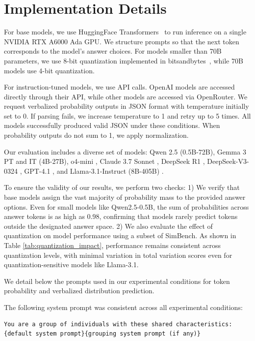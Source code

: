 \documentclass{article} %
\begin{document}
\section{Implementation Details}
\label{sec:implementation_details}

For base models, we use HuggingFace Transformers~\citep{wolf-etal-2020-transformers} to run inference on a single NVIDIA RTX A6000 Ada GPU. We structure prompts so that the next token corresponds to the model's answer choices. For models smaller than 70B parameters, we use 8-bit quantization implemented in bitsandbytes~\citep{10.5555/3600270.3602468}, while 70B models use 4-bit quantization.

For instruction-tuned models, we use API calls. OpenAI models are accessed directly through their API, while other models are accessed via OpenRouter. We request verbalized probability outputs in JSON format with temperature initially set to 0. If parsing fails, we increase temperature to 1 and retry up to 5 times. All models successfully produced valid JSON under these conditions. When probability outputs do not sum to 1, we apply normalization.

Our evaluation includes a diverse set of models: Qwen 2.5 \citep{yang2024qwen2} (0.5B-72B), Gemma 3 \citep{team2025gemma} PT and IT (4B-27B), o4-mini \citep{openai2025o3o4}, Claude 3.7 Sonnet \citep{anthropic2025claude}, DeepSeek R1 \citep{guo2025deepseek}, DeepSeek-V3-0324 \cite{deepseekai2024deepseekv3technicalreport}, GPT-4.1 \cite{openai2025gpt41}, and Llama-3.1-Instruct (8B-405B) \citep{meta2024llama3.1}.

To ensure the validity of our results, we perform two checks: 1) We verify that base models assign the vast majority of probability mass to the provided answer options. Even for small models like Qwen2.5-0.5B, the sum of probabilities across answer tokens is as high as 0.98, confirming that models rarely predict tokens outside the designated answer space. 2) We also evaluate the effect of quantization on model performance using a subset of SimBench. As shown in Table \ref{tab:quantization_impact}, performance remains consistent across quantization levels, with minimal variation in total variation scores even for quantization-sensitive models like Llama-3.1.

We detail below the prompts used in our experimental conditions for token probability and verbalized distribution prediction.

The following system prompt was consistent across all experimental conditions:
\begin{examplebox}
\begin{Verbatim}[breaklines=true,fontfamily=\rmdefault]
You are a group of individuals with these shared characteristics:
{default system prompt}{grouping system prompt (if any)}
\end{Verbatim}
\end{examplebox}
\end{document}

